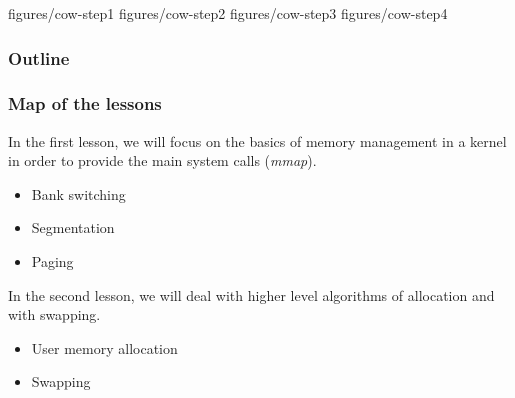 
		{figures/cow-step1}
		{figures/cow-step2}
		{figures/cow-step3}
		{figures/cow-step4}

%
%



%
%

\begin{frame}
  \titlepage

  \begin{center}
    \logos
  \end{center}
\end{frame}

%
%

\begin{frame}
  \frametitle{Outline}
  \tableofcontents
\end{frame}


\begin{frame}
  \frametitle{Map of the lessons}

  In the first lesson, we will focus on the basics of memory
  management in a kernel in order to provide the main system calls
  (\emph{mmap}).

  \begin{itemize}
  \item
    Bank switching
  \item
    Segmentation
  \item
    Paging
  \end{itemize}

  \-

  In the second lesson, we will deal with higher level algorithms of
  allocation and with swapping.

  \begin{itemize}
  \item
    User memory allocation
  \item
    Swapping
  \end{itemize}

\end{frame}

%
%

